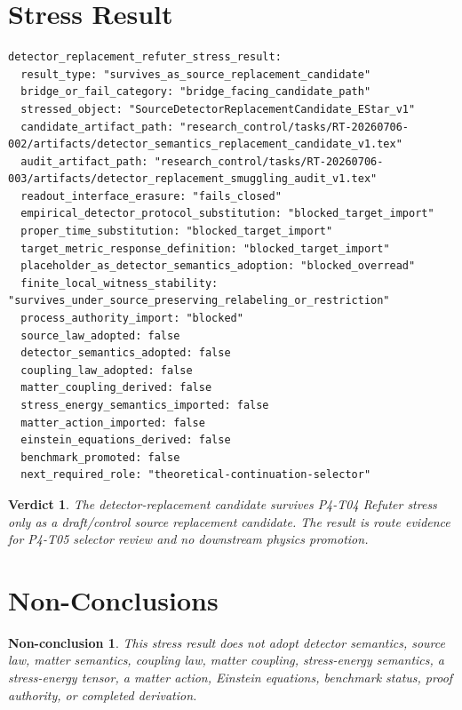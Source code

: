 \documentclass[11pt]{article}
\newtheorem{verdict}{Verdict}
\newtheorem{nonconclusion}{Non-conclusion}
\begin{document}
\section{Stress Result}

\begin{verbatim}
detector_replacement_refuter_stress_result:
  result_type: "survives_as_source_replacement_candidate"
  bridge_or_fail_category: "bridge_facing_candidate_path"
  stressed_object: "SourceDetectorReplacementCandidate_EStar_v1"
  candidate_artifact_path: "research_control/tasks/RT-20260706-002/artifacts/detector_semantics_replacement_candidate_v1.tex"
  audit_artifact_path: "research_control/tasks/RT-20260706-003/artifacts/detector_replacement_smuggling_audit_v1.tex"
  readout_interface_erasure: "fails_closed"
  empirical_detector_protocol_substitution: "blocked_target_import"
  proper_time_substitution: "blocked_target_import"
  target_metric_response_definition: "blocked_target_import"
  placeholder_as_detector_semantics_adoption: "blocked_overread"
  finite_local_witness_stability: "survives_under_source_preserving_relabeling_or_restriction"
  process_authority_import: "blocked"
  source_law_adopted: false
  detector_semantics_adopted: false
  coupling_law_adopted: false
  matter_coupling_derived: false
  stress_energy_semantics_imported: false
  matter_action_imported: false
  einstein_equations_derived: false
  benchmark_promoted: false
  next_required_role: "theoretical-continuation-selector"
\end{verbatim}

\begin{verdict}
The detector-replacement candidate survives P4-T04 Refuter stress only as a
draft/control source replacement candidate. The result is route evidence for
P4-T05 selector review and no downstream physics promotion.
\end{verdict}

\section{Non-Conclusions}

\begin{nonconclusion}
This stress result does not adopt detector semantics, source law, matter
semantics, coupling law, matter coupling, stress-energy semantics, a
stress-energy tensor, a matter action, Einstein equations, benchmark status,
proof authority, or completed derivation.
\end{nonconclusion}
\end{document}
